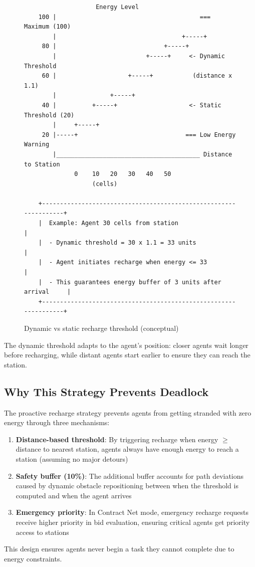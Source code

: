 \documentclass[titlepage=formal,code=listings,logo=../../assets/火炬+英文校名-左右.pdf]{../../SUSTechHomework}
\begin{document}
\begin{figure}[htbp]
  \centering
  {\ttfamily\small
  \begin{minipage}{0.95\linewidth}
  \begin{verbatim}
                    Energy Level
    100 |                                        === Maximum (100)
        |                                   +-----+
     80 |                              +-----+
        |                         +-----+     <- Dynamic Threshold
     60 |                    +-----+           (distance x 1.1)
        |               +-----+
     40 |          +-----+                    <- Static Threshold (20)
        |     +-----+
     20 |-----+                              === Low Energy Warning
        |________________________________________ Distance to Station
              0    10   20   30   40   50
                   (cells)

    +-----------------------------------------------------------------+
    |  Example: Agent 30 cells from station                           |
    |  - Dynamic threshold = 30 x 1.1 = 33 units                    |
    |  - Agent initiates recharge when energy <= 33                 |
    |  - This guarantees energy buffer of 3 units after arrival     |
    +-----------------------------------------------------------------+
  \end{verbatim}
  \end{minipage}}
  \caption{Dynamic vs static recharge threshold (conceptual)}
\end{figure}

The dynamic threshold adapts to the agent's position: closer agents wait longer before recharging, while distant agents start earlier to ensure they can reach the station.

\subsection{Why This Strategy Prevents Deadlock}

The proactive recharge strategy prevents agents from getting stranded with zero energy through three mechanisms:

\begin{enumerate}
  \item \textbf{Distance-based threshold}: By triggering recharge when energy $\geq$ distance to nearest station, agents always have enough energy to reach a station (assuming no major detours)
  \item \textbf{Safety buffer (10\%)}: The additional buffer accounts for path deviations caused by dynamic obstacle repositioning between when the threshold is computed and when the agent arrives
  \item \textbf{Emergency priority}: In Contract Net mode, emergency recharge requests receive higher priority in bid evaluation, ensuring critical agents get priority access to stations
\end{enumerate}

This design ensures agents never begin a task they cannot complete due to energy constraints.


\end{document}
